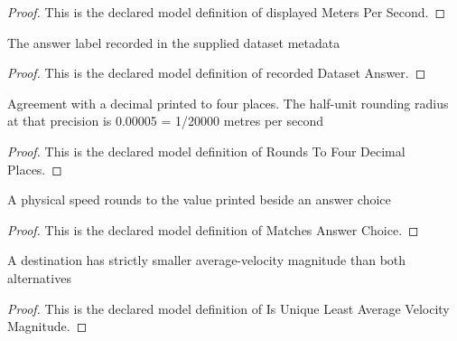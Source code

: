 \begin{proof}
  This is the declared model definition of displayed Meters Per Second.
\end{proof}
\begin{definition}
  \label{def:physics:phyx-mini-0737:phyxminiproblems-problemphyxmini0737-recordeddatasetanswer}
  The answer label recorded in the supplied dataset metadata
\end{definition}
\begin{proof}
  This is the declared model definition of recorded Dataset Answer.
\end{proof}
\begin{definition}
  \label{def:physics:phyx-mini-0737:phyxminiproblems-problemphyxmini0737-roundstofourdecimalplaces}
  Agreement with a decimal printed to four places. The half-unit rounding radius at that precision is 0.00005 = 1/20000 metres per second
\end{definition}
\begin{proof}
  This is the declared model definition of Rounds To Four Decimal Places.
\end{proof}
\begin{definition}
  \label{def:physics:phyx-mini-0737:phyxminiproblems-problemphyxmini0737-matchesanswerchoice}
  A physical speed rounds to the value printed beside an answer choice
\end{definition}
\begin{proof}
  This is the declared model definition of Matches Answer Choice.
\end{proof}
\begin{definition}
  \label{def:physics:phyx-mini-0737:phyxminiproblems-problemphyxmini0737-isuniqueleastaveragevelocitymagnitude}
  A destination has strictly smaller average-velocity magnitude than both alternatives
\end{definition}
\begin{proof}
  This is the declared model definition of Is Unique Least Average Velocity Magnitude.
\end{proof}
